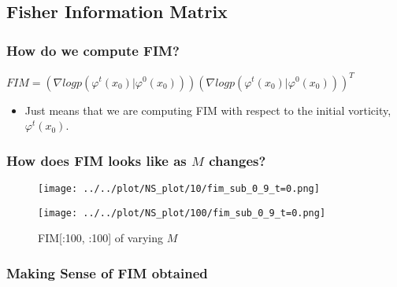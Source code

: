 \documentclass[
]{article}
\providecommand{\tightlist}{%
  \setlength{\itemsep}{0pt}\setlength{\parskip}{0pt}}\usepackage{longtable,booktabs,array}
\begin{document}
\subsection{Fisher Information
Matrix}\label{fisher-information-matrix-1}

\subsubsection{How do we compute FIM?}\label{how-do-we-compute-fim}

\(FIM = \left(\nabla log p( \varphi^t(x_0) | \varphi^0(x_0))\right)\left(\nabla log p( \varphi^t(x_0) | \varphi^0(x_0))\right)^T\)

\begin{itemize}
\tightlist
\item
  Just means that we are computing FIM with respect to the initial
  vorticity, \(\varphi^t(x_0)\).
\end{itemize}

\subsubsection{\texorpdfstring{How does FIM looks like as \(M\)
changes?}{How does FIM looks like as M changes?}}\label{how-does-fim-looks-like-as-m-changes}

\begin{figure}

\begin{minipage}{0.50\linewidth}

\texttt{[image: ../../plot/NS\_plot/10/fim\_sub\_0\_9\_t=0.png]}

\end{minipage}%
%
\begin{minipage}{0.50\linewidth}

\texttt{[image: ../../plot/NS\_plot/100/fim\_sub\_0\_9\_t=0.png]}

\end{minipage}%

\caption{\label{fig-fim_NS}FIM{[}:100, :100{]} of varying \(M\)}

\end{figure}%

\subsubsection{Making Sense of FIM
obtained}\label{making-sense-of-fim-obtained-1}
\end{document}
